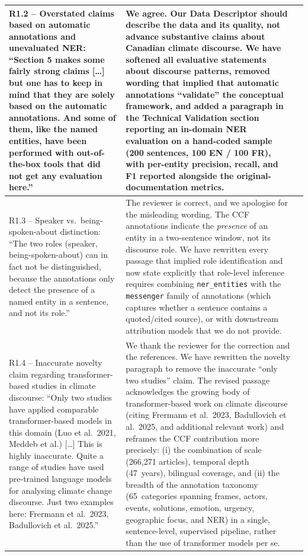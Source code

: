 \documentclass[11pt]{article}
\begin{document}
\begin{landscape}
\begin{longtable}{|L{4cm}|L{12cm}|L{9cm}|}
R1.2 -- Overstated claims based on automatic annotations and unevaluated NER: \enquote{Section 5 makes some fairly strong claims [\dots] but one has to keep in mind that they are solely based on the automatic annotations. And some of them, like the named entities, have been performed with out-of-the-box tools that did not get any evaluation here.} &
We agree. Our Data Descriptor should describe the data and its quality, not advance substantive claims about Canadian climate discourse. We have softened all evaluative statements about discourse patterns, removed wording that implied that automatic annotations \enquote{validate} the conceptual framework, and added a paragraph in the Technical Validation section reporting an in-domain NER evaluation on a hand-coded sample (200 sentences, 100 EN / 100 FR), with per-entity precision, recall, and F1 reported alongside the original-documentation metrics. &
\\
\hline

R1.3 -- Speaker vs.\ being-spoken-about distinction: \enquote{The two roles (speaker, being-spoken-about) can in fact not be distinguished, because the annotations only detect the presence of a named entity in a sentence, and not its role.} &
The reviewer is correct, and we apologise for the misleading wording. The CCF annotations indicate the \emph{presence} of an entity in a two-sentence window, not its discourse role. We have rewritten every passage that implied role identification and now state explicitly that role-level inference requires combining \texttt{ner\_entities} with the \texttt{messenger} family of annotations (which captures whether a sentence contains a quoted/cited source), or with downstream attribution models that we do not provide. &
\\
\hline

R1.4 -- Inaccurate novelty claim regarding transformer-based studies in climate discourse: \enquote{Only two studies have applied comparable transformer-based models in this domain (Luo et al.\ 2021, Meddeb et al.) [\dots] This is highly inaccurate. Quite a range of studies have used pre-trained language models for analysing climate change discourse. Just two examples here: Frermann et al.\ 2023, Badullovich et al.\ 2025.} &
We thank the reviewer for the correction and the references. We have rewritten the novelty paragraph to remove the inaccurate \enquote{only two studies} claim. The revised passage acknowledges the growing body of transformer-based work on climate discourse (citing Frermann et al.\ 2023, Badullovich et al.\ 2025, and additional relevant work) and reframes the CCF contribution more precisely: (i) the combination of scale (266{,}271 articles), temporal depth (47~years), bilingual coverage, and (ii) the breadth of the annotation taxonomy (65~categories spanning frames, actors, events, solutions, emotion, urgency, geographic focus, and NER) in a single, sentence-level, supervised pipeline, rather than the use of transformer models per se. &
\\
\hline


\end{longtable}
\end{landscape}
\end{document}
